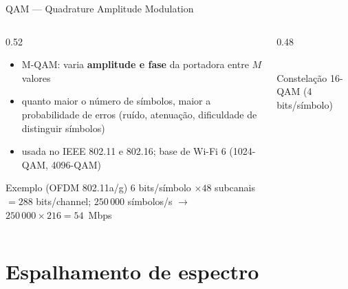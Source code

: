 \documentclass[aspectratio=169,11pt]{beamer}
\begin{document}
\begin{frame}{QAM --- Quadrature Amplitude Modulation}
  \begin{columns}
    \begin{column}{0.52\textwidth}
      \begin{itemize}
        \item M-QAM: varia \textbf{amplitude e fase} da portadora entre $M$ valores
        \item quanto maior o número de símbolos, maior a probabilidade de erros (ruído, atenuação, dificuldade de distinguir símbolos)
        \item usada no IEEE 802.11 e 802.16; base de Wi-Fi 6 (1024-QAM, 4096-QAM)
      \end{itemize}
      \begin{exampleblock}{Exemplo (OFDM 802.11a/g)}
        $6$ bits/símbolo $\times 48$ subcanais $= 288$ bits/channel; $250\,000$ símbolos/s $\rightarrow$ $250\,000 \times 216 = 54$~Mbps
      \end{exampleblock}
    \end{column}
    \begin{column}{0.48\textwidth}
      \begin{center}
        \\ \scriptsize Constelação 16-QAM (4 bits/símbolo)
      \end{center}
    \end{column}
  \end{columns}
\end{frame}

\section{Espalhamento de espectro}
\end{document}
